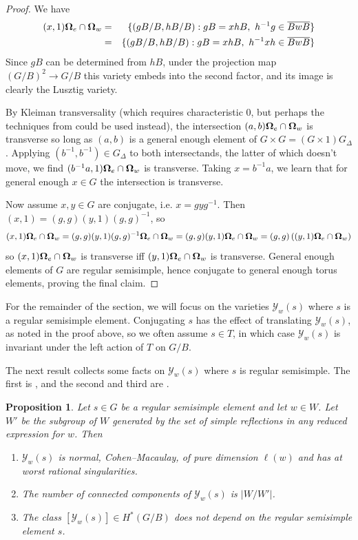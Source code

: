 \documentclass[10pt,a4paper]{amsart}
\newtheorem{proposition}[Thm]{Proposition}
\newcommand\bOm{{\bf \Omega}}
\newcommand\calY{{\mathcal Y}}
\begin{document}
\begin{proof}
  We have 
  \begin{eqnarray*}
    (x, 1) \bOm_e \cap \bOm_w
    &=& \{(gB/B, hB/B): gB = xhB,\ h^{-1}g \in \overline{BwB} \}  \\
    &=& \{(gB/B, hB/B): gB = xhB,\ h^{-1}xh \in \overline{BwB} \}  
  \end{eqnarray*}
  Since $gB$ can be determined from $hB$, under the projection map
  $(G/B)^2\to G/B$ this variety embeds into the second factor, and its
  image is clearly the Lusztig variety.

  By Kleiman transversality (which requires characteristic $0$,
  but perhaps the techniques from \cite{SchubertInduction} could be
  used instead), the
  intersection $(a,b)\bOm_e \cap \bOm_w$ is transverse so long as
  $(a,b)$ is a general enough element of $G\times G = (G\times 1)G_\Delta$.
  Applying $(b^{-1},b^{-1})\in G_\Delta$ to both intersectands, the latter
  of which doesn't move, we find $(b^{-1}a,1)\bOm_e \cap \bOm_w$ is transverse.
  Taking $x = b^{-1}a$, we learn that for general enough $x\in G$
  the intersection is transverse.

  Now assume $x,y \in G$ are conjugate, i.e. $x = g y g^{-1}$.
  Then $(x,1) = (g,g)(y,1)(g,g)^{-1}$, so
  \[ (x,1)\bOm_e \cap \bOm_w
  = (g,g)(y,1)(g,g)^{-1}\bOm_e \cap \bOm_w
  = (g,g)(y,1)\bOm_e \cap \bOm_w
  = (g,g)\left( (y,1)\bOm_e \cap \bOm_w\right)
  \]
  so $(x,1)\bOm_e \cap \bOm_w$ is transverse iff
  $(y,1)\bOm_e \cap \bOm_w$ is transverse. General enough elements of
  $G$ are regular semisimple, hence conjugate to general enough torus elements,
  proving the final claim.
\end{proof}

For the remainder of the section, we will focus on the varieties
$\calY_w(s)$ where $s$ is a regular semisimple element. 
Conjugating $s$ has the effect of translating $\calY_w(s)$, as noted
in the proof above, so we often assume $s \in T$, in which case $\calY_w(s)$ is invariant under the left action of $T$ on $G/B$.


The next result collects some facts on $\calY_w(s)$ where $s$ is regular semisimple. The first is \cite[Theorem 1.1]{BHL25-geomLusztig}, and the second and third are \cite[Theorem 4.6, Lemma 4.8]{K20-deligne-lusztig}.

\begin{proposition}\label{thm: Lusztig facts}
    Let $s \in G$ be a regular semisimple element and let $w \in W$. Let $W'$ be the subgroup of $W$ generated by the set of simple reflections in any reduced expression for $w$. Then

    \begin{enumerate}
    \item $\calY_w(s)$ is normal, Cohen--Macaulay, of pure dimension
      $\ell(w)$ and has at worst rational singularities.
    \item The number of connected components of $\calY_w(s)$ is $|W/W'|$.
    \item The class $[\calY_w(s)] \in H^*(G/B)$ does not depend on the
      regular semisimple element $s$.
    \end{enumerate}
\end{proposition}
\end{document}
